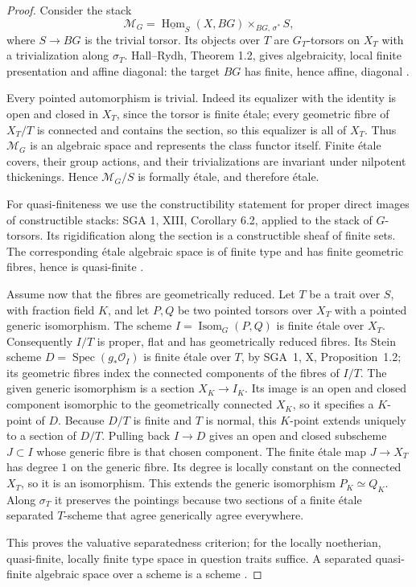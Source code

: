 \begin{proof}
Consider the stack
\[
\mathcal M_G=
\underline{\operatorname{Hom}}_S(X,BG)
\mathbin{\times}_{BG,\,\sigma^*}S,
\]
where $S\to BG$ is the trivial torsor.  Its objects over $T$ are
$G_T$-torsors on $X_T$ with a trivialization along $\sigma_T$.
Hall--Rydh, Theorem 1.2, gives algebraicity, local finite presentation
and affine diagonal: the target $BG$ has finite, hence affine,
diagonal \cite[Theorem~1.2]{C_HallRydh2019}.

Every pointed automorphism is trivial.  Indeed its equalizer with
the identity is open and closed in $X_T$, since the torsor is finite
\'etale; every geometric fibre of $X_T/T$ is connected and contains
the section, so this equalizer is all of $X_T$.  Thus $\mathcal M_G$
is an algebraic space and represents the class functor itself.
Finite \'etale covers, their group actions, and their trivializations
are invariant under nilpotent thickenings.  Hence $\mathcal M_G/S$
is formally \'etale, and therefore \'etale.

For quasi-finiteness we use the constructibility statement for proper
direct images of constructible stacks: SGA 1, XIII, Corollary 6.2,
applied to the stack of $G$-torsors.  Its rigidification along the
section is a constructible sheaf of finite sets.  The corresponding
\'etale algebraic space is of finite type and has finite geometric
fibres, hence is quasi-finite
\cite[Expos\'e~XIII, Corollary~6.2]{C_SGA1}.

Assume now that the fibres are geometrically reduced.  Let $T$ be a
trait over $S$, with fraction field $K$, and let $P,Q$ be two pointed
torsors over $X_T$ with a pointed generic isomorphism.  The scheme
$I=\operatorname{Isom}_{G}(P,Q)$ is finite \'etale over $X_T$.
Consequently $I/T$ is proper, flat and has geometrically reduced
fibres.  Its Stein scheme $D=\operatorname{Spec}(g_*\mathcal O_I)$
is finite \'etale over $T$, by SGA~1, X, Proposition~1.2; its
geometric fibres index the connected components of the fibres of
$I/T$.  The given generic isomorphism is a section $X_K\to I_K$.
Its image is an open and closed component isomorphic to the
geometrically connected $X_K$, so it specifies a $K$-point of $D$.
Because $D/T$ is finite and $T$ is normal, this $K$-point extends
uniquely to a section of $D/T$.  Pulling back $I\to D$ gives an
open and closed subscheme $J\subset I$ whose generic fibre is that
chosen component.  The finite \'etale map $J\to X_T$ has degree
$1$ on the generic fibre.  Its degree is locally constant on the
connected $X_T$, so it is an isomorphism.  This extends the generic
isomorphism $P_K\simeq Q_K$.  Along $\sigma_T$ it preserves the
pointings because two sections of a finite \'etale separated
$T$-scheme that agree generically agree everywhere.

This proves the valuative separatedness criterion; for the
locally noetherian, quasi-finite, locally finite type space in
question traits suffice.  A separated quasi-finite algebraic space
over a scheme is a scheme
\cite[Expos\'e~X, Proposition~1.2]{C_SGA1}.
\end{proof}

